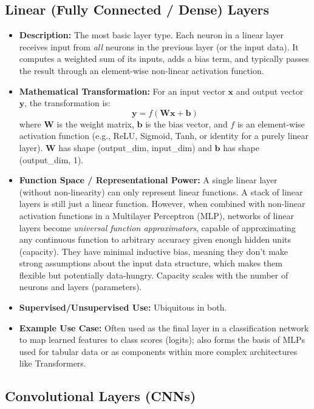 \documentclass{article}
\newcommand{\bW}{\bm{W}}
\newcommand{\bb}{\bm{b}}
\newcommand{\bx}{\bm{x}}
\newcommand{\by}{\bm{y}}
\begin{document}
\subsection{Linear (Fully Connected / Dense) Layers}

\begin{itemize}
    \item \textbf{Description:} The most basic layer type. Each neuron in a linear layer receives input from \emph{all} neurons in the previous layer (or the input data). It computes a weighted sum of its inputs, adds a bias term, and typically passes the result through an element-wise non-linear activation function.
    \item \textbf{Mathematical Transformation:} For an input vector $\bx$ and output vector $\by$, the transformation is:
        \begin{equation}
            \by = f(\bW \bx + \bb)
        \end{equation}
        where $\bW$ is the weight matrix, $\bb$ is the bias vector, and $f$ is an element-wise activation function (e.g., ReLU, Sigmoid, Tanh, or identity for a purely linear layer). $\bW$ has shape (output\_dim, input\_dim) and $\bb$ has shape (output\_dim, 1).
    \item \textbf{Function Space / Representational Power:} A single linear layer (without non-linearity) can only represent linear functions. A stack of linear layers is still just a linear function. However, when combined with non-linear activation functions in a Multilayer Perceptron (MLP), networks of linear layers become \emph{universal function approximators}, capable of approximating any continuous function to arbitrary accuracy given enough hidden units (capacity). They have minimal inductive bias, meaning they don't make strong assumptions about the input data structure, which makes them flexible but potentially data-hungry. Capacity scales with the number of neurons and layers (parameters).
    \item \textbf{Supervised/Unsupervised Use:} Ubiquitous in both.
    \item \textbf{Example Use Case:} Often used as the final layer in a classification network to map learned features to class scores (logits); also forms the basis of MLPs used for tabular data or as components within more complex architectures like Transformers.
\end{itemize}

\subsection{Convolutional Layers (CNNs)}
\end{document}
